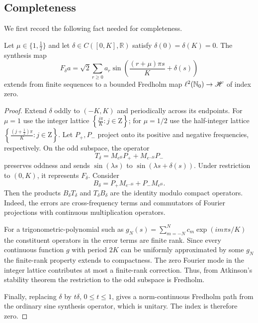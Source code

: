 \subsection{Completeness}
We first record the following fact needed for completeness.
\begin{lemma}\label{lem:phase}
  Let $\mu\in\{1,\tfrac12\}$ and let $\delta\in C([0,K],\mathbb R)$ satisfy
  $\delta(0)=\delta(K)=0$. The synthesis map
  \begin{equation}
    F_\delta a=\sqrt2\sum_{r\geq0}a_r
    \sin\!\left(\frac{(r+\mu)\pi s}{K}+\delta(s)\right)
  \end{equation}
  extends from finite sequences to a bounded Fredholm map $\ell^2(\mathbb
    N_0)\to\mathscr H$ of index zero.
\end{lemma}
\begin{proof}
  Extend $\delta$ oddly to $(-K,K)$ and periodically across its endpoints. For
  $\mu=1$ use the integer lattice
  $\left\{\frac{j\pi}{K}:j\in\mathrm{Z}\right\}$; for $\mu=1/2$ use the
  half-integer lattice
  $\left\{\frac{\left(j+\frac{1}{2}\right)\pi}{K}:j\in\mathrm{Z}\right\}$.
  Let $P_+,P_-$ project onto its positive and negative frequencies,
  respectively. On the odd subspace, the operator
  \begin{equation}
    T_\delta=M_{e^{\ii\delta}}P_++M_{e^{-\ii\delta}}P_-
  \end{equation}
  preserves oddness and sends $\sin(\lambda s)$ to $\sin(\lambda s+\delta(s))$.
  Under restriction to $(0,K)$, it represents $F_\delta$. Consider
  \begin{equation}
    B_\delta=P_+M_{e^{-\ii\delta}}+P_-M_{e^{\ii\delta}}.
  \end{equation}
  Then the products $B_\delta T_\delta$ and $T_\delta B_\delta$ are the identity
  modulo compact operators. Indeed, the errors are cross-frequency terms and
  commutators of Fourier projections with continuous multiplication operators.

  For a trigonometric-polynomial such as $g_N(s)=\sum_{m=-N}^Nc_m\exp(im\pi
  s/K)$ the constituent operators in the error terms are finite rank. Since
  every continuous function $g$ with period $2K$ can be uniformly approximated
  by some $g_N$ the finite-rank property extends to compactness. The zero
  Fourier mode in the integer lattice contributes at most a finite-rank
  correction. Thus, from Atkinson's stability theorem the restriction to the odd
  subspace is Fredholm.

  Finally, replacing $\delta$ by $t\delta$, $0\leq t\leq1$, gives a
  norm-continuous Fredholm path from the ordinary sine synthesis operator, which
  is unitary. The index is therefore zero.
\end{proof}

